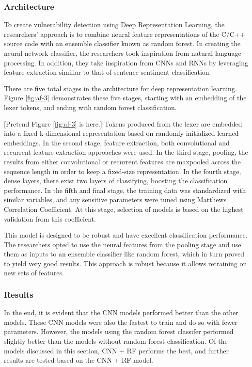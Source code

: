 \documentclass[12pt,twocolumn,letterpaper]{article}
\begin{document}
\subsubsection{Architecture}
To create vulnerability detection using Deep Representation Learning, the researchers' approach is to combine
neural feature representations of the C/C++ source code with an ensemble classifier known as random forest. In creating
the neural network classifier, the researchers took inspiration from natural language processing. In addition, they take
inspiration from CNNs and RNNs by leveraging feature-extraction similiar to that of sentence sentiment classification.

There are five total stages in the architecture for deep representation learning. Figure \ref{fig:af-3} demonstrates these
five stages, starting with an embedding of the lexer tokens, and ending with random forest classification.

[Pretend Figure \ref{fig:af-3} is here.]
\linebreak
Tokens produced from the lexer are embedded into a fixed k-dimensional representation based on randomly initialized learned embeddings.
In the second stage, feature extraction, both convolutional and recurrent feature extraction approaches were used.
In the third stage, pooling, the results from either convolutional or recurrent features are maxpooled across the sequence length in order to
keep a fixed-size representation.
In the fourth stage, dense layers, there exist two layers of classifying, boosting the classification performance.
In the fifth and final stage, the training data was standardized with similar variables, and any sensitive parameters were tuned using Matthews Correlation Coefficient.
At this stage, selection of models is based on the highest validation from this coefficient.

This model is designed to be robust and have excellent classification performance. The researchers opted to use the
neural features from the pooling stage and use them as inputs to an ensemble classifier like random forest, which in turn
proved to yield very good results. This approach is robust because it allows retraining on new sets of features.

\subsubsection{Results}
In the end, it is evident that the CNN models performed better than the other models. These CNN models were also the fastest to train
and do so with fewer parameters. However, the models using the random forest classifer performed slightly better than the models without random forest classification.
Of the models discussed in this section, CNN + RF performs the best, and further results are tested based on the CNN + RF model.
\end{document}
